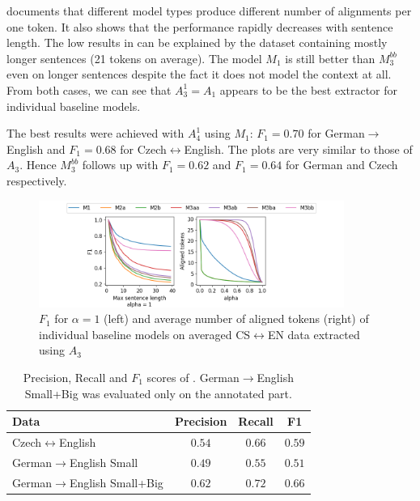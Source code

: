  documents that different model types produce different number of alignments per one token. It also shows that the performance rapidly decreases with sentence length. The low results in  can be explained by the dataset containing mostly longer sentences (21 tokens on average). The model $M_1$ is still better than $M_3^{bb}$ even on longer sentences despite the fact it does not model the context at all.
From both cases, we can see that $A_3^1 = A_1$ appears to be the best extractor for individual baseline models.

The best results were achieved with $A_4^1$ using $M_1$: $F_1 = 0.70$ for German$\rightarrow$English and $F_1 = 0.68$ for Czech$\leftrightarrow$English. The plots are very similar to those of $A_3$. Hence $M_3^{bb}$ follows up with $F_1 = 0.62$ and $F_1 = 0.64$ for German and Czech respectively.  

\begin{figure}[h!]
    \center
    \includegraphics[width=0.89\textwidth]{img/individual_ts_encs_mix_a3.png}
    \caption{$F_1$ for $\alpha=1$ (left) and average number of aligned tokens (right) of individual baseline models on averaged CS$\leftrightarrow$EN data extracted using $A_3$ \label{fig:individual_ts_encs_mix_a3}}
\end{figure}

\begin{table}[h!]
    \center
    \begin{tabular}{lccc}
        \toprule
        Data & Precision & Recall & F1 \\
        \midrule
        Czech$\leftrightarrow$English & $0.54$ & $0.66$ & $0.59$ \\
        German$\rightarrow$English Small & $0.49$ & $0.55$ & $0.51$\\
        German$\rightarrow$English Small+Big & $0.62$ & $0.72$ & $0.66$ \\
        \bottomrule
    \end{tabular}
    \caption{Precision, Recall and $F_1$ scores of \fastalign{}. German$\rightarrow$English Small+Big was evaluated only on the annotated part. \label{tab:individual_fastalign}}
\end{table}

